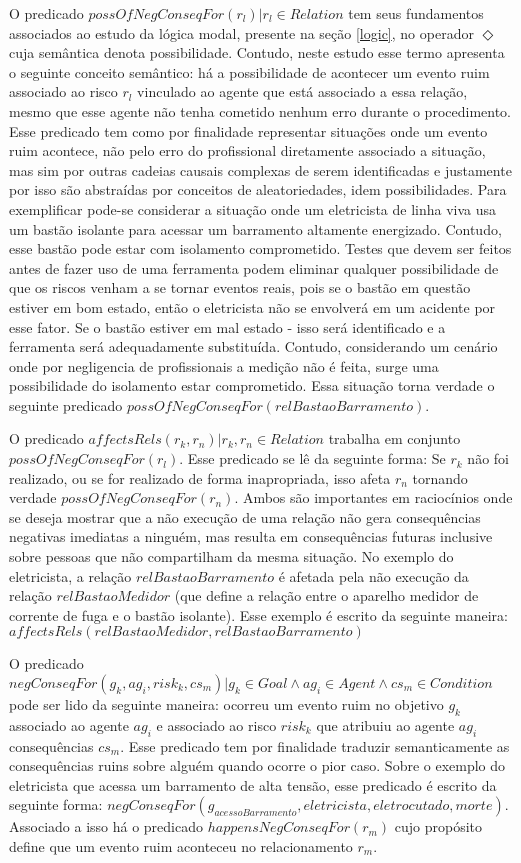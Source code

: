 O predicado $possOfNegConseqFor(r_l) | r_l \in Relation $ tem seus fundamentos associados ao estudo da lógica modal, presente na seção \ref{logic}, no operador $\Diamond$ cuja semântica denota possibilidade. Contudo, neste estudo esse termo apresenta o seguinte conceito semântico: há a possibilidade de acontecer um evento ruim associado ao risco $r_l$ vinculado ao agente que está associado a essa relação, mesmo que esse agente não tenha cometido nenhum erro durante o procedimento. Esse predicado tem como por finalidade representar situações onde um evento ruim acontece, não pelo erro do profissional diretamente associado a situação, mas sim por outras cadeias causais complexas de serem identificadas e justamente por isso são abstraídas por conceitos de aleatoriedades, idem possibilidades. Para exemplificar pode-se considerar a situação onde um eletricista de linha viva usa um bastão isolante para acessar um barramento altamente energizado. Contudo, esse bastão pode estar com isolamento comprometido. Testes que devem ser feitos antes de fazer uso de uma ferramenta podem eliminar qualquer possibilidade de que os riscos venham a se tornar eventos reais, pois se o bastão em questão estiver em bom estado, então o eletricista não se envolverá em um acidente por esse fator. Se o bastão estiver em mal estado - isso será identificado e a ferramenta será adequadamente substituída. Contudo, considerando um cenário onde por negligencia de profissionais a medição não é feita, surge uma possibilidade do isolamento estar comprometido. Essa situação torna verdade o seguinte predicado $possOfNegConseqFor(relBastaoBarramento)$.

O predicado $affectsRels(r_k,r_n) |  r_k, r_n  \in Relation $ trabalha em conjunto $possOfNegConseqFor(r_l)$. Esse predicado se lê da seguinte forma: Se $r_k$ não foi realizado, ou se for realizado de forma inapropriada, isso afeta  $r_n$ tornando verdade $possOfNegConseqFor(r_n)$. Ambos são importantes em raciocínios onde se deseja mostrar que a não execução de uma relação não gera consequências negativas imediatas a ninguém, mas resulta em consequências futuras inclusive sobre pessoas que não compartilham da mesma situação. No exemplo do eletricista, a relação $relBastaoBarramento$ é afetada pela não execução da relação $relBastaoMedidor$ (que define a relação entre o aparelho medidor de corrente de fuga e o bastão isolante). Esse exemplo é escrito da seguinte maneira:$affectsRels(relBastaoMedidor,relBastaoBarramento)$

O predicado $negConseqFor(g_k, ag_i,risk_k,cs_m) | g_k \in Goal \wedge ag_i \in Agent \wedge cs_m \in Condition $ pode ser lido da seguinte maneira: ocorreu um evento ruim no objetivo $g_k$ associado ao agente $ag_i$ e associado ao risco $risk_k$ que atribuiu ao agente $ag_i$ consequências $cs_m$. Esse predicado tem por finalidade traduzir semanticamente as consequências ruins sobre alguém quando ocorre o pior caso. Sobre o exemplo do eletricista que acessa um barramento de alta tensão, esse predicado é escrito da seguinte forma: $negConseqFor(g_{acessoBarramento}, eletricista,eletrocutado,morte)$. Associado a isso há o predicado $happensNegConseqFor(r_m)$ cujo propósito define que um evento ruim aconteceu no relacionamento $r_m$.

